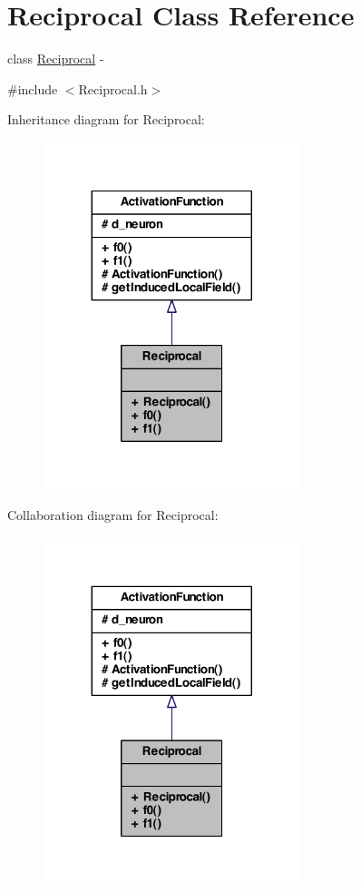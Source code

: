 \hypertarget{class_reciprocal}{
\section{Reciprocal Class Reference}
\label{class_reciprocal}
}


class \hyperlink{class_reciprocal}{Reciprocal} -\/  




{\ttfamily \#include $<$Reciprocal.h$>$}



Inheritance diagram for Reciprocal:
\nopagebreak
\begin{figure}[H]
\begin{center}
\leavevmode
\includegraphics[width=212pt]{class_reciprocal__inherit__graph}
\end{center}
\end{figure}


Collaboration diagram for Reciprocal:
\nopagebreak
\begin{figure}[H]
\begin{center}
\leavevmode
\includegraphics[width=212pt]{class_reciprocal__coll__graph}
\end{center}
\end{figure}
